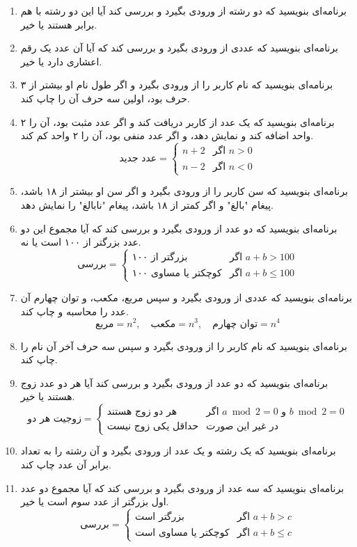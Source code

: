 \documentclass[b5paper,12pt]{article}
\begin{document}
\begin{enumerate}
		\item برنامه‌ای بنویسید که دو رشته از ورودی بگیرد و بررسی کند آیا این دو رشته با هم برابر هستند یا خیر.
		\item برنامه‌ای بنویسید که عددی از ورودی بگیرد و بررسی کند که آیا آن عدد یک رقم اعشاری دارد یا خیر.
		\item برنامه‌ای بنویسید که نام کاربر را از ورودی بگیرد و اگر طول نام او بیشتر از ۳ حرف بود، اولین سه حرف آن را چاپ کند.
		\item برنامه‌ای بنویسید که یک عدد از کاربر دریافت کند و اگر عدد مثبت بود، آن را ۲ واحد اضافه کند و نمایش دهد، و اگر عدد منفی بود، آن را ۲ واحد کم کند.
		\[
		\text{عدد جدید} = 
		\begin{cases} 
			n + 2 & \text{اگر } n > 0 \\ 
			n - 2 & \text{اگر } n < 0 
		\end{cases} 
		\]
		\item برنامه‌ای بنویسید که سن کاربر را از ورودی بگیرد و اگر سن او بیشتر از ۱۸ باشد، پیغام "بالغ" و اگر کمتر از ۱۸ باشد، پیغام "نابالغ" را نمایش دهد.
		\item برنامه‌ای بنویسید که دو عدد از ورودی بگیرد و بررسی کند که آیا مجموع این دو عدد بزرگتر از ۱۰۰ است یا نه.
		\[
		\text{بررسی} = 
		\begin{cases} 
			\text{بزرگتر از ۱۰۰} & \text{اگر } a + b > 100 \\ 
			\text{کوچکتر یا مساوی ۱۰۰} & \text{اگر } a + b \leq 100 
		\end{cases} 
		\]
		\item برنامه‌ای بنویسید که عددی از ورودی بگیرد و سپس مربع، مکعب، و توان چهارم آن عدد را محاسبه و چاپ کند.
		\[
		\text{مربع} = n^2, \quad 
		\text{مکعب} = n^3, \quad 
		\text{توان چهارم} = n^4
		\]
		\item برنامه‌ای بنویسید که نام کاربر را از ورودی بگیرد و سپس سه حرف آخر آن نام را چاپ کند.
		\item برنامه‌ای بنویسید که دو عدد از ورودی بگیرد و بررسی کند آیا هر دو عدد زوج هستند یا خیر.
		\[
		\text{زوجیت هر دو} = 
		\begin{cases} 
			\text{هر دو زوج هستند} & \text{اگر } a \bmod 2 = 0 \text{ و } b \bmod 2 = 0 \\ 
			\text{حداقل یکی زوج نیست} & \text{در غیر این صورت} 
		\end{cases} 
		\]
		\item برنامه‌ای بنویسید که یک رشته و یک عدد از ورودی بگیرد و آن رشته را به تعداد برابر آن عدد چاپ کند.
		\item برنامه‌ای بنویسید که سه عدد از ورودی بگیرد و بررسی کند که آیا مجموع دو عدد اول بزرگتر از عدد سوم است یا خیر.
		\[
		\text{بررسی} = 
		\begin{cases} 
			\text{بزرگتر است} & \text{اگر } a + b > c \\ 
			\text{کوچکتر یا مساوی است} & \text{اگر } a + b \leq c 
		\end{cases} 
		\]
		
		
	\end{enumerate}
	
\end{document}
